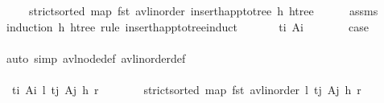 \begin{isabellebody}
\ \ \ \ \ {\isachardoublequoteopen}strict{\isacharunderscore}{\kern0pt}sorted\ {\isacharparenleft}{\kern0pt}map\ fst\ {\isacharparenleft}{\kern0pt}avl{\isacharunderscore}{\kern0pt}inorder\ {\isacharparenleft}{\kern0pt}insert{\isacharunderscore}{\kern0pt}happ{\isacharunderscore}{\kern0pt}to{\isacharunderscore}{\kern0pt}tree\ h\ htree{\isacharparenright}{\kern0pt}{\isacharparenright}{\kern0pt}{\isacharparenright}{\kern0pt}{\isachardoublequoteclose}\isanewline
%
\isadelimproof
\ \ \ \ %
\endisadelimproof
%
\isatagproof
{}\isamarkupfalse%
\ assms\isanewline
\ \ \isamarkupfalse%
\ {\isacharparenleft}{\kern0pt}induction\ h\ htree\ rule{\isacharcolon}{\kern0pt}\ insert{\isacharunderscore}{\kern0pt}happ{\isacharunderscore}{\kern0pt}to{\isacharunderscore}{\kern0pt}tree{\isachardot}{\kern0pt}induct{\isacharparenright}{\kern0pt}\isanewline
\ \ \ \ \isamarkupfalse%
\ {\isacharparenleft}{\kern0pt}{}\ t\isactrlsub i\ A\isactrlsub i{\isacharparenright}{\kern0pt}\isanewline
\ \ \ \ \isamarkupfalse%
\ \isamarkupfalse%
\ {\isacharquery}{\kern0pt}case\ \isanewline
\ \ \ \ \ \ \isamarkupfalse%
\ {\isacharparenleft}{\kern0pt}auto\ simp{\isacharcolon}{\kern0pt}\ avl{\isacharunderscore}{\kern0pt}node{\isacharunderscore}{\kern0pt}def\ avl{\isacharunderscore}{\kern0pt}inorder{\isacharunderscore}{\kern0pt}def{\isacharparenright}{\kern0pt}\ \ \ \ \ \ \ \ \ \ \ \ \ \ \ \ \ \ \ \ \ \ \ \ \ \ \ \ \ \ \ \ \ \ \ \ \ \ \ \ \ \ \ \ \ \ \ \ \ \ \ \ \ \ \ \ \ \ \ \ \ \ \ \ \ \ \ \ \ \ \ \ \ \ \ \ \ \ \ \ \ \ \ \ \ \ \ \ \ \isanewline
\ \ \isamarkupfalse%
\isanewline
\ \ \ \ \isamarkupfalse%
\ {\isacharparenleft}{\kern0pt}{}\ t\isactrlsub i\ A\isactrlsub i\ l\ t\isactrlsub j\ A\isactrlsub j\ h\ r{\isacharparenright}{\kern0pt}\isanewline
\ \ \ \ \isamarkupfalse%
\ \isamarkupfalse%
\ {\isachardoublequoteopen}strict{\isacharunderscore}{\kern0pt}sorted\ {\isacharparenleft}{\kern0pt}map\ fst\ {\isacharparenleft}{\kern0pt}avl{\isacharunderscore}{\kern0pt}inorder\ {\isasymlangle}l{\isacharcomma}{\kern0pt}\ {\isacharparenleft}{\kern0pt}{\isacharparenleft}{\kern0pt}t\isactrlsub j{\isacharcomma}{\kern0pt}\ A\isactrlsub j{\isacharparenright}{\kern0pt}{\isacharcomma}{\kern0pt}\ h{\isacharparenright}{\kern0pt}{\isacharcomma}{\kern0pt}\ r{\isasymrangle}{\isacharparenright}{\kern0pt}{\isacharparenright}{\kern0pt}{\isachardoublequoteclose}\isanewline
\ \ \ \ \ \ \isamarkupfalse%

\end{isabellebody}
